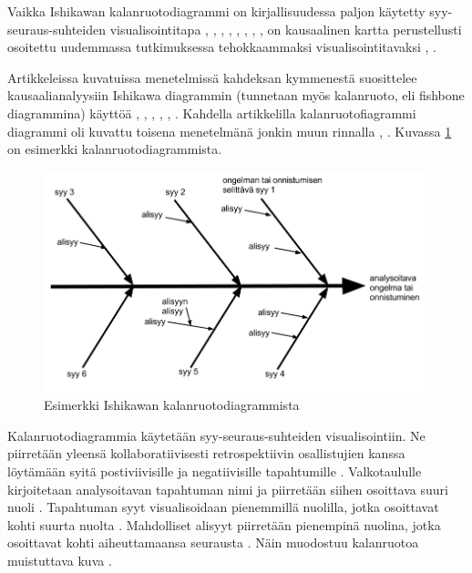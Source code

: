 Vaikka Ishikawan kalanruotodiagrammi \citep{ishikawa1990introduction} on kirjallisuudessa paljon käytetty syy-seuraus-suhteiden visualisointitapa \citep{kalinowski2012evidence}, \citep{Bjornson2009}, \citep{de2004learning}, \citep{staalhane2004root}, \citep{dingsoyr2003extending}, \citep{staalhane2003post}, \citep{birk2002postmortem}, \citep{card1998learning}, on kausaalinen kartta perustellusti osoitettu uudemmassa tutkimuksessa tehokkaammaksi visualisointitavaksi \citep{Bjornson2009}, \citep{Lehtinen2011}. 

Artikkeleissa kuvatuissa menetelmissä kahdeksan kymmenestä suosittelee kausaalianalyysiin Ishikawa diagrammin (tunnetaan myös kalanruoto, eli fishbone diagrammina) käyttöä \citep{kalinowski2012evidence}, \citep{de2004learning}, \citep{staalhane2004root}, \citep{dingsoyr2003extending}, \citep{birk2002postmortem}, \citep{card1998learning}. Kahdella artikkelilla kalanruotofiagrammi diagrammi oli kuvattu toisena menetelmänä jonkin muun rinnalla \citep{Bjornson2009}, \citep{staalhane2003post}. Kuvassa \ref{ishikawa_ex} on esimerkki kalanruotodiagrammista.

\begin{figure}[ht!]
\centering
\includegraphics[width=150mm]{ishikawa_esimerkki.png}
\caption{Esimerkki Ishikawan kalanruotodiagrammista}
\label{ishikawa_ex}
\end{figure}

Kalanruotodiagrammia käytetään syy-seuraus-suhteiden visualisointiin. Ne piirretään yleensä kollaboratiivisesti retrospektiivin osallistujien kanssa löytämään syitä postiviivisille ja negatiivisille tapahtumille \citep{birk2002postmortem}. Valkotaululle kirjoitetaan analysoitavan tapahtuman nimi ja piirretään siihen osoittava suuri nuoli \citep{Bjornson2009}. Tapahtuman syyt visualisoidaan pienemmillä nuolilla, jotka osoittavat kohti suurta nuolta \citep{Bjornson2009}. Mahdolliset alisyyt piirretään pienempinä nuolina, jotka osoittavat kohti aiheuttamaansa seurausta \citep{Bjornson2009}. Näin muodostuu kalanruotoa muistuttava kuva \citep{birk2002postmortem}.

